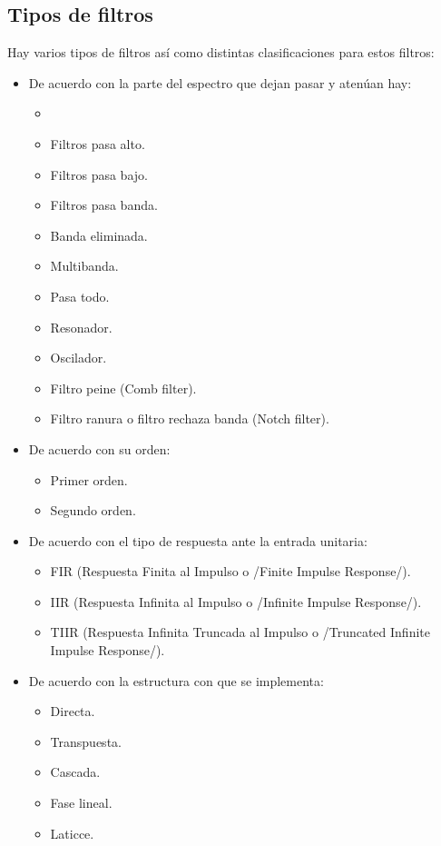 \subsection{Tipos de filtros}

    Hay varios tipos de filtros así como distintas clasificaciones para estos filtros:

    \begin{itemize}
      \item De acuerdo con la parte del espectro que dejan pasar y atenúan hay:
            \begin{itemize}
              \item
              \item Filtros pasa alto.
              \item Filtros pasa bajo.
              \item Filtros pasa banda.
              \item Banda eliminada.
              \item Multibanda.
              \item Pasa todo.
              \item Resonador.
              \item Oscilador.
              \item Filtro peine (Comb filter).
              \item Filtro ranura o filtro rechaza banda (Notch filter).
            \end{itemize}
        \item De acuerdo con su orden:
            \begin{itemize}
              \item Primer orden.
              \item Segundo orden.
            \end{itemize}
        \item De acuerdo con el tipo de respuesta ante la entrada unitaria:
            \begin{itemize}
              \item FIR (Respuesta Finita al Impulso o /Finite Impulse Response/).
              \item IIR (Respuesta Infinita al Impulso o /Infinite Impulse Response/).
              \item TIIR (Respuesta Infinita Truncada al Impulso o /Truncated Infinite Impulse Response/).
            \end{itemize}
      \item De acuerdo con la estructura con que se implementa:
            \begin{itemize}
              \item Directa.
              \item Transpuesta.
              \item Cascada.
              \item Fase lineal.
              \item Laticce.
            \end{itemize}
    \end{itemize}

